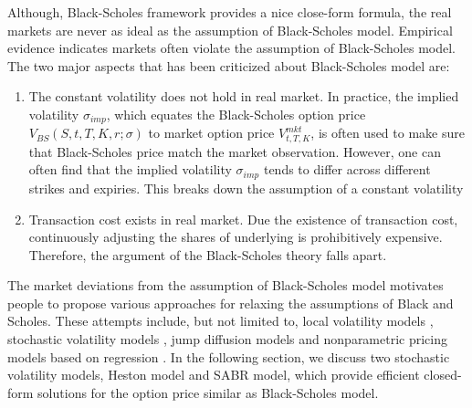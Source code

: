 \documentclass[letterpaper,12pt,titlepage,oneside,final]{book}
\numberwithin{equation}{section}
\theoremstyle{definition}
\begin{document}
Although, Black-Scholes framework provides a nice close-form formula, the real markets are never as ideal as the assumption of Black-Scholes model. Empirical  evidence indicates markets often violate the assumption of   Black-Scholes model. The two major aspects that has been criticized about Black-Scholes model are:
\begin{enumerate}
\item The constant volatility does not hold in real market. In practice, the implied volatility $\sigma_{imp}$, which equates the Black-Scholes option price $V_{BS}(S,t,T,K,r;\sigma)$ to market option price $V^{mkt}_{t,T,K}$, is often used to make sure that Black-Scholes price match the market observation. However, one can often find that the implied volatility $\sigma_{imp}$ tends to differ across different strikes and expiries. This breaks down the assumption of a constant volatility
\item Transaction cost exists in real market. Due the existence of transaction cost, continuously adjusting the shares of underlying is prohibitively expensive. Therefore, the argument of the Black-Scholes theory falls apart.
\end{enumerate}
The market deviations from the assumption of Black-Scholes model  motivates people to propose various approaches for relaxing the assumptions of Black and Scholes. These attempts include, but not limited to, local volatility models \citep{coleman2001,dumas1998implied,rubinstein1994implied,dupire1994pricing}, stochastic volatility models \cite{hagan2002managing,heston1993closed,hull1987pricing,bakshi1997empirical}, jump diffusion models \citep{He06,kou2002jump} and nonparametric pricing models based on regression \citep{yao2000option,bennell2004black,gradojevic2009option,garcia2000pricing,malliaris1993neural}. In the following section, we discuss two stochastic volatility models, Heston model and SABR model, which provide efficient closed-form solutions for the option price similar as Black-Scholes model.
\end{document}
